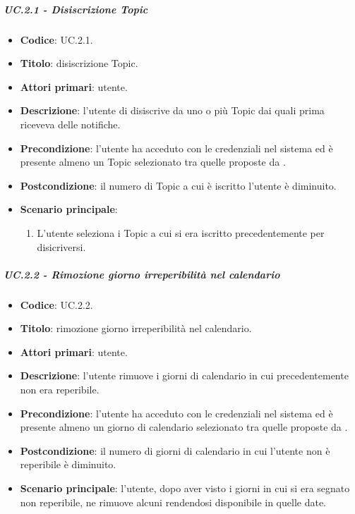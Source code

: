 	
	\subparagraph{UC\theuccount.2.1 - Disiscrizione Topic}
	\begin{itemize}
		\item \textbf{Codice}: UC\theuccount.2.1.
		\item \textbf{Titolo}: disiscrizione Topic.
		\item \textbf{Attori primari}: utente.
		\item \textbf{Descrizione}: l'utente di disiscrive da uno o più Topic dai quali prima riceveva delle notifiche.
		\item \textbf{Precondizione}: l'utente ha acceduto con le credenziali nel sistema ed è presente almeno un Topic selezionato tra quelle proposte da \progetto.
		\item \textbf{Postcondizione}: il numero di Topic a cui è iscritto l'utente è diminuito.
		\item \textbf{Scenario principale}:
		\begin{enumerate}
			\item L'utente seleziona i Topic a cui si era iscritto precedentemente per disicriversi.
		\end{enumerate}
	\end{itemize}
	
			
	\subparagraph{UC\theuccount.2.2 - Rimozione giorno irreperibilità nel calendario}
	\begin{itemize}
		\item \textbf{Codice}: UC\theuccount.2.2.
		\item \textbf{Titolo}: rimozione giorno irreperibilità nel calendario.
		\item \textbf{Attori primari}: utente.
		\item \textbf{Descrizione}: l'utente rimuove i giorni di calendario in cui precedentemente non era reperibile.
		\item \textbf{Precondizione}: l'utente ha acceduto con le credenziali nel sistema ed è presente almeno un giorno di calendario selezionato tra quelle proposte da \progetto.
		\item \textbf{Postcondizione}: il numero di giorni di calendario in cui l'utente non è reperibile è diminuito.
		\item \textbf{Scenario principale}: l'utente, dopo aver visto i giorni in cui si era segnato non reperibile, ne rimuove alcuni rendendosi disponibile in quelle date.
	\end{itemize}
			
